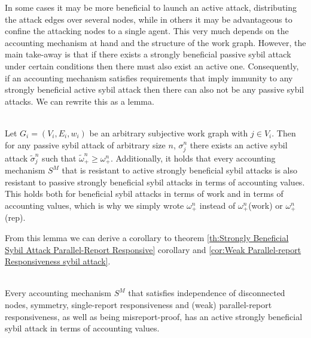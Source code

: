 \noindent{}In some cases it may be more beneficial to launch an active attack, distributing the attack edges over several nodes, while in others it may be advantageous to confine the attacking nodes to a single agent. This very much depends on the accounting mechanism at hand and the structure of the work graph. However, the main take-away is that if there exists a strongly beneficial passive sybil attack under certain conditions then there must also exist an active one. Consequently, if an accounting mechanism satisfies requirements that imply immunity to any strongly beneficial active sybil attack then there can also not be any passive sybil attacks. We can rewrite this as a lemma. \vspace{1em}\\

\begin{lemma}[]\ \\
\label{lem:Active attacks stronger passive attacks}
\noindent{}Let $G_i=(V_i,E_i,w_i)$ be an arbitrary subjective work graph with $j\in{}V_i$. Then for any passive sybil attack of arbitrary size $n$, $\sigma_j^n$ there exists an active sybil attack $\tilde{\sigma}_j^n$ such that $\tilde{\omega}_{+}^n \geq \omega_{+}^n$. Additionally, it holds that every accounting mechanism $S^M$ that is resistant to active strongly beneficial sybil attacks is also resistant to passive strongly beneficial sybil attacks in terms of accounting values. \vspace{1em}\\

\noindent{}This holds both for beneficial sybil attacks in terms of work and in terms of accounting values, which is why we simply wrote $\omega_{+}^n$ instead of $\omega_{+}^n$(work) or $\omega_{+}^n$(rep).\vspace{1em}\\
\end{lemma}

\noindent{}From this lemma we can derive a corollary to theorem \ref{th:Strongly Beneficial Sybil Attack Parallel-Report Responsive} corollary and \ref{cor:Weak Parallel-report Responsiveness sybil attack}. \vspace{1em}\\

\begin{corollary}[]\ \\
\label{cor:Active Parallel-report Responsiveness Sybil Attack}
Every accounting mechanism $S^M$ that satisfies independence of disconnected nodes, symmetry, single-report responsiveness and (weak) parallel-report responsiveness, as well as being misreport-proof, has an active strongly beneficial sybil attack in terms of accounting values. 
\end{corollary}

